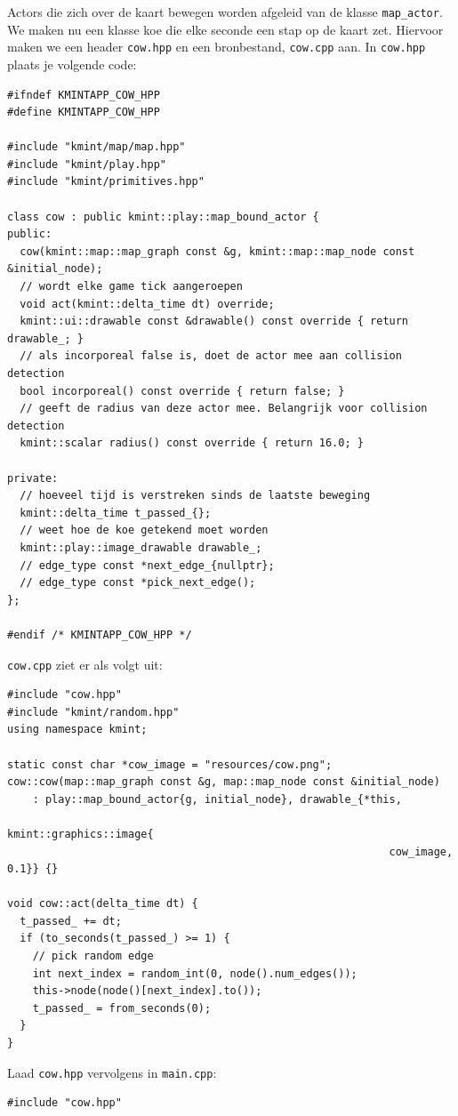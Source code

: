 \documentclass[11pt]{article}
\begin{document}
Actors die zich over de kaart bewegen worden afgeleid van de klasse
\texttt{map\_actor}. We maken nu een klasse koe die elke seconde een stap op de
kaart zet. Hiervoor maken we een header \texttt{cow.hpp} en een bronbestand,
\texttt{cow.cpp} aan. In \texttt{cow.hpp} plaats je volgende code:
\begin{verbatim}
#ifndef KMINTAPP_COW_HPP
#define KMINTAPP_COW_HPP

#include "kmint/map/map.hpp"
#include "kmint/play.hpp"
#include "kmint/primitives.hpp"

class cow : public kmint::play::map_bound_actor {
public:
  cow(kmint::map::map_graph const &g, kmint::map::map_node const &initial_node);
  // wordt elke game tick aangeroepen
  void act(kmint::delta_time dt) override;
  kmint::ui::drawable const &drawable() const override { return drawable_; }
  // als incorporeal false is, doet de actor mee aan collision detection
  bool incorporeal() const override { return false; }
  // geeft de radius van deze actor mee. Belangrijk voor collision detection
  kmint::scalar radius() const override { return 16.0; }

private:
  // hoeveel tijd is verstreken sinds de laatste beweging
  kmint::delta_time t_passed_{};
  // weet hoe de koe getekend moet worden
  kmint::play::image_drawable drawable_;
  // edge_type const *next_edge_{nullptr};
  // edge_type const *pick_next_edge();
};

#endif /* KMINTAPP_COW_HPP */
\end{verbatim}

\texttt{cow.cpp} ziet er als volgt uit:
\begin{verbatim}
#include "cow.hpp"
#include "kmint/random.hpp"
using namespace kmint;

static const char *cow_image = "resources/cow.png";
cow::cow(map::map_graph const &g, map::map_node const &initial_node)
    : play::map_bound_actor{g, initial_node}, drawable_{*this,
                                                        kmint::graphics::image{
                                                            cow_image, 0.1}} {}

void cow::act(delta_time dt) {
  t_passed_ += dt;
  if (to_seconds(t_passed_) >= 1) {
    // pick random edge
    int next_index = random_int(0, node().num_edges());
    this->node(node()[next_index].to());
    t_passed_ = from_seconds(0);
  }
}
\end{verbatim}

Laad \texttt{cow.hpp} vervolgens in \texttt{main.cpp}:
\begin{verbatim}
#include "cow.hpp"
\end{verbatim}
\end{document}
